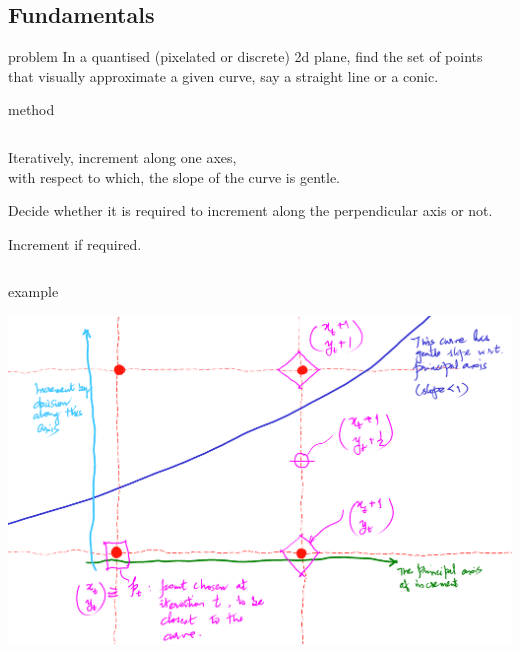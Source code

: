 \documentclass[aspectratio=169,xcolor={dvipsnames,svgnames}]{beamer}
\begin{document}
\subsection{Fundamentals}
\label{sec:org8b6be91}

\begin{frame}[label={sec:org1219b3f}]{problem}
In a quantised (pixelated or discrete) 2d plane, find
the set of points that visually approximate a given
curve, say a straight line or a conic.
\end{frame}

\begin{frame}[label={sec:orgb9d85e3}]{method}
\begin{columns}
\begin{column}{.5\columnwidth}
Iteratively, increment along one axes, \\[0pt]
with respect to which, the slope of the curve is
gentle.

{\vspace{\baselineskip}}
Decide whether it is required to increment along the
perpendicular axis or not.

{\vspace{\baselineskip}}
Increment if required.
\end{column}
\end{columns}
\end{frame}

\begin{frame}[label={sec:org6739222}]{example}
\begin{center}
\includegraphics[width=0.8\linewidth]{images/basic-midpoint-algo.png}
\end{center}
\end{frame}
\end{document}

